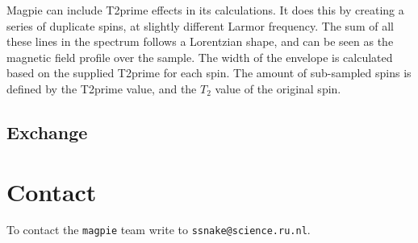 \documentclass[11pt,a4paper]{article}
\begin{document}
Magpie can include T2prime effects in its calculations. It does this by creating a series of duplicate spins, at slightly different Larmor frequency. The sum of all these lines in the spectrum follows a Lorentzian shape, and can be seen as the magnetic field profile over the sample. The width of the envelope is calculated based on the supplied T2prime for each spin. The amount of sub-sampled spins is defined by the T2prime value, and the $T_2$ value of the original spin.

\subsection{Exchange}

\section{Contact}
To contact the \texttt{magpie} team write to \texttt{ssnake@science.ru.nl}.



\end{document}
